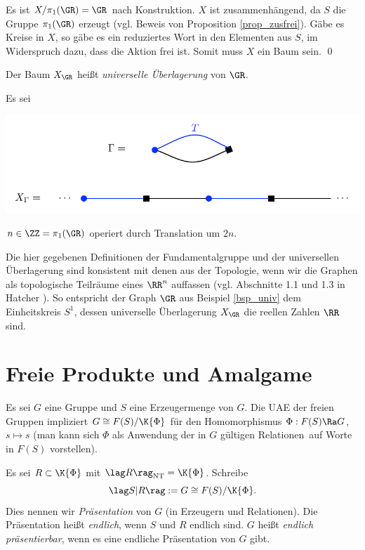 Es ist $X/\pi_1(\GR)=\GR$ nach Konstruktion. $X$ ist
zusammenhängend, da $S$ die Gruppe $\pi_1(\GR)$ erzeugt
(vgl. Beweis von Proposition \ref{prop_zusfrei}).
Gäbe es Kreise in $X$, so gäbe es ein reduziertes Wort in den
Elementen aus $S$, im Widerspruch dazu, dass die Aktion frei ist.
Somit muss $X$ ein Baum sein.
\qed

\DEF Der Baum $X_{\GR}$ heißt \emph{universelle Überlagerung} von $\GR$.

\BSP\label{bsp_univ} Es sei
\begin{center}
	\includegraphics{grugraImages/univ}
\end{center}
$n\in\ZZ=\pi_1(\GR)$ operiert durch Translation um $2n$.

Die hier gegebenen Definitionen der Fundamentalgruppe und der
universellen Überlagerung sind konsistent mit denen aus der
Topologie, wenn wir die Graphen als topologische Teilräume
eines $\RR^n$ auffassen
(vgl. Abschnitte 1.1 und 1.3 in Hatcher \cite{hatcher}).
So entspricht der Graph $\GR$ aus
Beispiel \ref{bsp_univ} dem Einheitskreis $S^1$, dessen
universelle Überlagerung $X_{\GR}$ die reellen Zahlen $\RR$ sind.


\section{Freie Produkte und Amalgame}\label{sec_amal}

Es sei $G$ eine Gruppe und $S$ eine Erzeugermenge von $G$.
Die UAE der freien Gruppen impliziert
$G\cong F(S)/\K{\Phi}$ für den Homomorphismus
$\Phi:F(S)\Ra G$, $s\mapsto s$ (man kann sich $\Phi$ als
\glqq Anwendung der in $G$ gültigen Relationen\grqq\ auf Worte
in $F(S)$ vorstellen).

\DEF Es sei $R\subset \K{\Phi}$ mit
$\lag R \rag_{\mathrm{NT}} = \K{\Phi}$. Schreibe
\[
\lag S|R \rag := G \cong F(S)/\K{\Phi}.
\]
Dies nennen wir \emph{Präsentation} von $G$
(in Erzeugern und Relationen). Die Präsentation heißt
\emph{endlich},
wenn $S$ und $R$ endlich sind. $G$ heißt \emph{endlich präsentierbar},
wenn es eine endliche Präsentation von $G$ gibt.

